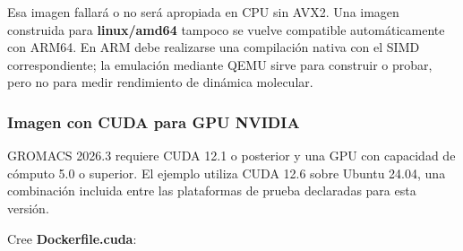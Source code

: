 \documentclass[
  spanish,
  11pt,
  a4paper]{article}
\begin{document}
Esa imagen fallará o no será apropiada en CPU sin AVX2. Una imagen
construida para \textbf{linux/amd64} tampoco se vuelve compatible
automáticamente con ARM64. En ARM debe realizarse una compilación nativa
con el SIMD correspondiente; la emulación mediante QEMU sirve para
construir o probar, pero no para medir rendimiento de dinámica
molecular.

\subsubsection{Imagen con CUDA para GPU
NVIDIA}\label{imagen-con-cuda-para-gpu-nvidia}

GROMACS 2026.3 requiere CUDA 12.1 o posterior y una GPU con capacidad de
cómputo 5.0 o superior. El ejemplo utiliza CUDA 12.6 sobre Ubuntu 24.04,
una combinación incluida entre las plataformas de prueba declaradas para
esta versión.

Cree \textbf{Dockerfile.cuda}:
\end{document}
